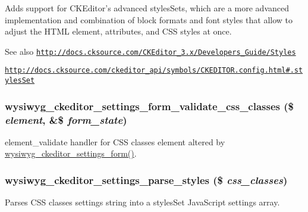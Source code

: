 Adds support for CKEditor's advanced stylesSets, which are a more advanced implementation and combination of block formats and font styles that allow to adjust the HTML element, attributes, and CSS styles at once.

\begin{DoxySeeAlso}{See also}
\href{http://docs.cksource.com/CKEditor_3.x/Developers_Guide/Styles}{\tt http://docs.cksource.com/CKEditor\_\-3.x/Developers\_\-Guide/Styles} 

\href{http://docs.cksource.com/ckeditor_api/symbols/CKEDITOR.config.html#.stylesSet}{\tt http://docs.cksource.com/ckeditor\_\-api/symbols/CKEDITOR.config.html\#.stylesSet} 
\end{DoxySeeAlso}
\hypertarget{ckeditor_8inc_a8b614c7b72178d43bc7028fbd35be0e2}{
\subsubsection[{wysiwyg\_\-ckeditor\_\-settings\_\-form\_\-validate\_\-css\_\-classes}]{\setlength{\rightskip}{0pt plus 5cm}wysiwyg\_\-ckeditor\_\-settings\_\-form\_\-validate\_\-css\_\-classes (\$ {\em element}, \/  \&\$ {\em form\_\-state})}}
\label{ckeditor_8inc_a8b614c7b72178d43bc7028fbd35be0e2}
element\_\-validate handler for CSS classes element altered by \hyperlink{ckeditor_8inc_a99ea1c868cbd240643f8f9299b73be3f}{wysiwyg\_\-ckeditor\_\-settings\_\-form()}. \hypertarget{ckeditor_8inc_a333ec4086966407d90ad5ab846f44f94}{
\subsubsection[{wysiwyg\_\-ckeditor\_\-settings\_\-parse\_\-styles}]{\setlength{\rightskip}{0pt plus 5cm}wysiwyg\_\-ckeditor\_\-settings\_\-parse\_\-styles (\$ {\em css\_\-classes})}}
\label{ckeditor_8inc_a333ec4086966407d90ad5ab846f44f94}
Parses CSS classes settings string into a stylesSet JavaScript settings array.


